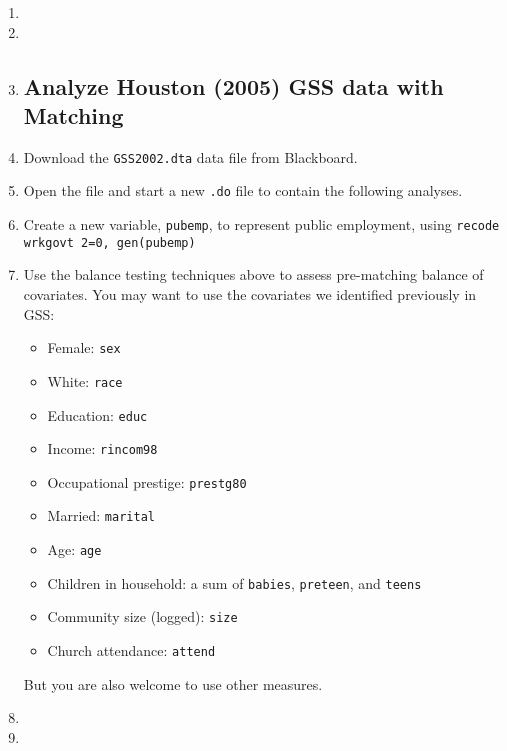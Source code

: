 \documentclass[a4paper,12pt]{article}
\begin{document}
\begin{enumerate}
\item %
\item %
\item %



\subsection*{Analyze Houston (2005) GSS data with Matching}

\item Download the \texttt{GSS2002.dta} data file from Blackboard.
\item Open the file and start a new \texttt{.do} file to contain the following analyses.

\item Create a new variable, \texttt{pubemp}, to represent public employment, using \texttt{recode wrkgovt 2=0, gen(pubemp)}
\item Use the balance testing techniques above to assess pre-matching balance of covariates. You may want to use the covariates we identified previously in GSS:
	\begin{itemize}
	\item Female: \texttt{sex}
	\item White: \texttt{race}
	\item Education: \texttt{educ}
	\item Income: \texttt{rincom98}
	\item Occupational prestige: \texttt{prestg80}
	\item Married: \texttt{marital}
	\item Age: \texttt{age}
	\item Children in household: a sum of \texttt{babies}, \texttt{preteen}, and \texttt{teens}
	\item Community size (logged): \texttt{size}
	\item Church attendance: \texttt{attend}
	\end{itemize}
But you are also welcome to use other measures.

\item %
\item %



\end{enumerate}
\end{document}
